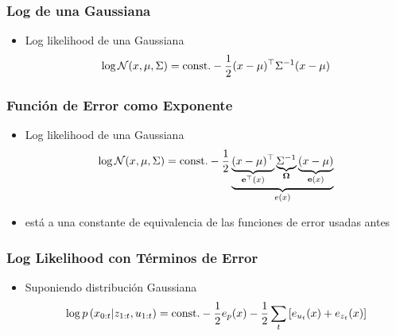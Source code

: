 \begin{frame}
    \frametitle{Log de una Gaussiana}
    
    \begin{itemize}
        \item Log likelihood de una Gaussiana
        \begin{equation*}
            \log \mathcal{N}(x, \mu, \Sigma) =  \text{const.} - \dfrac{1}{2} (x - \mu)^{\top} {\Sigma}^{-1} (x - \mu)
        \end{equation*}
    \end{itemize}
    
\end{frame}

\begin{frame}
    \frametitle{Función de Error como Exponente}
    
    \begin{itemize}
        \item Log likelihood de una Gaussiana
        \begin{equation*}
            \log \mathcal{N}(x, \mu, \Sigma) =  \text{const.} - \dfrac{1}{2} \underbrace{\underbrace{(x - \mu)^{\top}}_{\boldsymbol{\mathbf{e}}^{\top}(x)} \underbrace{{\Sigma}^{-1}}_{\boldsymbol{\mathbf{\Omega}}} \underbrace{(x - \mu)}_{\boldsymbol{\mathbf{e}}(x)}}_{e(x)}
        \end{equation*}
        \item está a una constante de equivalencia de las funciones de error usadas antes
    \end{itemize}
    
\end{frame}

\begin{frame}
    \frametitle{Log Likelihood con Términos de Error}
    
    \begin{itemize}
        \item Suponiendo distribución Gaussiana
        \begin{equation*}
            \log p\left( x_{0:t} | z_{1:t}, u_{1:t} \right) = \text{const.} - \dfrac{1}{2} e_{p}(x) -  \dfrac{1}{2} \sum_{t} \left[ e_{u_{t}}(x) + e_{z_{t}}(x)\right]
        \end{equation*}
    \end{itemize}
    
\end{frame}

